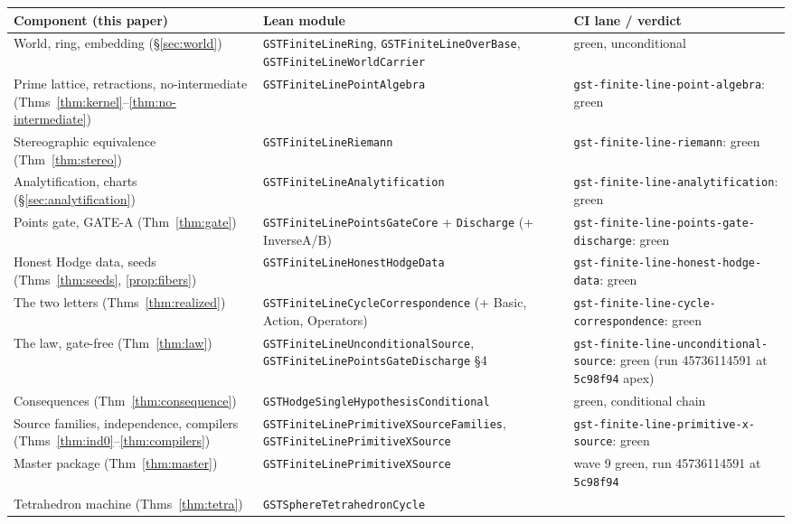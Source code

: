 \documentclass[11pt,a4paper]{article}
\theoremstyle{plain}
\theoremstyle{definition}
\begin{document}
\begin{longtable}{@{}p{}p{}p{}@{}}
\toprule
\textbf{Component (this paper)} & \textbf{Lean module} &
\textbf{CI lane / verdict}\\
\midrule
\endhead
World, ring, embedding (\S\ref{sec:world}) &
\texttt{GSTFiniteLineRing}, \texttt{GSTFiniteLineOverBase},
\texttt{GSTFiniteLineWorldCarrier} & green, unconditional\\
Prime lattice, retractions, no-intermediate
(Thms~\ref{thm:kernel}--\ref{thm:no-intermediate}) &
\texttt{GSTFiniteLinePointAlgebra} &
\texttt{gst-finite-line-point-algebra}: green\\
Stereographic equivalence (Thm~\ref{thm:stereo}) &
\texttt{GSTFiniteLineRiemann} & \texttt{gst-finite-line-riemann}:
green\\
Analytification, charts (\S\ref{sec:analytification}) &
\texttt{GSTFiniteLineAnalytification} &
\texttt{gst-finite-line-analytification}: green\\
Points gate, GATE-A (Thm~\ref{thm:gate}) &
\texttt{GSTFiniteLinePointsGateCore} + \texttt{Discharge} (+ InverseA/B) &
\texttt{gst-finite-line-points-gate-discharge}: green\\
Honest Hodge data, seeds (Thms~\ref{thm:seeds},
\ref{prop:fibers}) & \texttt{GSTFiniteLineHonestHodgeData} &
\texttt{gst-finite-line-honest-hodge-data}: green\\
The two letters (Thms~\ref{thm:realized}) &
\texttt{GSTFiniteLineCycleCorrespondence} (+ Basic, Action,
Operators) & \texttt{gst-finite-line-cycle-correspondence}:
green\\
The law, gate-free (Thm~\ref{thm:law}) &
\texttt{GSTFiniteLineUnconditionalSource},
\texttt{GSTFiniteLinePointsGateDischarge} \S4 &
\texttt{gst-finite-line-unconditional-source}: green (run
45736114591 at \texttt{5c98f94} apex)\\
Consequences (Thm~\ref{thm:consequence}) &
\texttt{GSTHodgeSingleHypothesisConditional} & green, conditional
chain\\
Source families, independence, compilers
(Thms~\ref{thm:ind0}--\ref{thm:compilers}) &
\texttt{GSTFiniteLinePrimitiveXSourceFamilies},
\texttt{GSTFiniteLinePrimitiveXSource} &
\texttt{gst-finite-line-primitive-x-source}: green\\
Master package (Thm~\ref{thm:master}) &
\texttt{GSTFiniteLinePrimitiveXSource} & wave 9 green, run
45736114591 at \texttt{5c98f94}\\
Tetrahedron machine (Thms~\ref{thm:tetra}) &
\texttt{GSTSphereTetrahedronCycle} &

\end{longtable}
\end{document}
